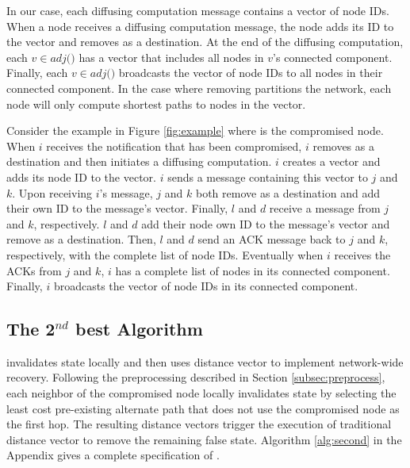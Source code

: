 In our case, each diffusing computation message contains a vector of node IDs.  When 
a node receives a diffusing computation message, the node adds its ID to the vector and removes \bad as a destination. At the end of the diffusing computation, 
each $v \in adj($\bads$)$ has a vector that includes all nodes in $v$'s connected component. Finally, each $v \in adj($\bads$)$ broadcasts the vector of node IDs to 
all nodes in their connected component. In the case where removing \bad partitions the network, each node will only compute shortest paths to nodes in the vector. 

Consider the example in Figure \ref{fig:example} where \bad is the compromised node. 
When $i$ receives the notification that \bad has been compromised, $i$ removes \bad as a destination and then initiates a diffusing computation. 
$i$ creates a vector and adds its node ID to the vector. $i$ sends a message containing this vector to $j$ and $k$.  Upon receiving $i$'s message,
$j$ and $k$ both remove \bad as a destination and add their own ID to the message's vector.  Finally, $l$ and $d$ receive a message from $j$ and $k$, respectively.  
$l$ and $d$ add their node own ID to the message's vector and remove \bad as a destination. Then, $l$ and $d$ send an ACK message back to $j$ and $k$, respectively, with the complete 
list of node IDs. Eventually when $i$ receives the ACKs from $j$ and $k$, $i$ has a complete list of nodes in its connected component. Finally, $i$ broadcasts the vector of node IDs
in its connected component. 


\subsection{The 2$^{nd}$ best Algorithm}
\label{subsec:second}
\second invalidates state locally and then uses distance vector to implement network-wide recovery.  Following the preprocessing described in Section \ref{subsec:preprocess}, 
each neighbor of the compromised node locally invalidates state by selecting the least cost pre-existing alternate path that does not use the compromised node as the first hop.
The resulting distance vectors trigger the execution of traditional distance vector to remove the remaining false state.
Algorithm \ref{alg:second} in the Appendix gives a complete specification of \seconds.

